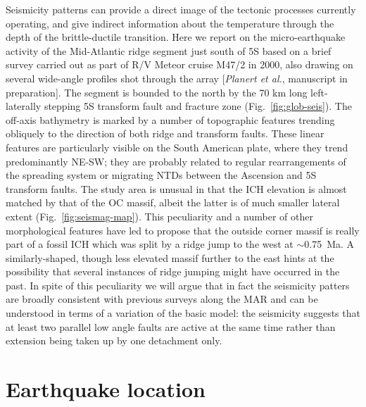 \documentclass[jgr]{aguplus}
\newlength{\tw}
\begin{document}
\begin{article}
Seismicity patterns can provide a direct image of the tectonic
processes currently operating, and give indirect information about the
temperature through the depth of the brittle-ductile transition.
Here we report on the micro-earthquake activity of the Mid-Atlantic
ridge segment just south of 5\dg S based on a brief survey carried out
as part of R/V Meteor
cruise M47/2 in 2000, also drawing on several wide-angle profiles shot
through the array [{\it Planert et al.}, manuscript in preparation].
The segment is bounded to the north by the 70 km long left-laterally
stepping 5\dg S transform fault and fracture zone
(Fig.~\ref{fig:glob-seis}).  The off-axis bathymetry is marked by a
number of topographic features trending obliquely to the direction of
both ridge and transform faults. These linear features are particularly visible on the South
American plate, where they trend predominantly NE-SW; they are probably
related to regular rearrangements of the spreading system or migrating
NTDs between the Ascension and 5\dg S transform faults.
 The study area is unusual in that the ICH elevation is almost matched
by that of the OC massif,
albeit the latter is of much smaller lateral extent
(Fig.~\ref{fig:seismag-map}).  This peculiarity and a number of other
morphological features have led \citet{reston02} to propose that the
outside corner massif is really part of a fossil ICH which was split
by a ridge jump to the west at $\sim$0.75~Ma.  A similarly-shaped,
though less elevated massif further to the east hints at the
possibility that several instances of ridge jumping might have
occurred in the past.   In spite of
this peculiarity we will argue that in fact the seismicity patters are
broadly consistent with previous surveys along the MAR and can be
understood in terms of a variation of the basic
\citet{tucholke94} model:  the seismicity suggests
that at least two parallel low angle faults are active at the same time
rather than extension being taken up by one detachment only.

\section{Earthquake location}


\end{article}
\end{document}
